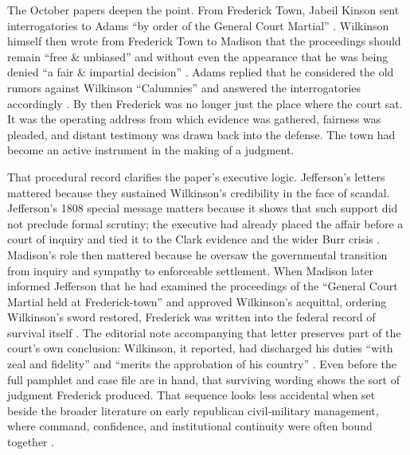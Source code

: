 The October papers deepen the point. From Frederick Town, Jabeil Kinson sent interrogatories to Adams ``by order of the General Court Martial'' \citep{kinson1811}. Wilkinson himself then wrote from Frederick Town to Madison that the proceedings should remain ``free \& unbiased'' and without even the appearance that he was being denied ``a fair \& impartial decision'' \citep{wilkinson1811madison}. Adams replied that he considered the old rumors against Wilkinson ``Calumnies'' and answered the interrogatories accordingly \citep{adams1811wilkinson}. By then Frederick was no longer just the place where the court sat. It was the operating address from which evidence was gathered, fairness was pleaded, and distant testimony was drawn back into the defense. The town had become an active instrument in the making of a judgment.

That procedural record clarifies the paper's executive logic. Jefferson's letters mattered because they sustained Wilkinson's credibility in the face of scandal. Jefferson's 1808 special message matters because it shows that such support did not preclude formal scrutiny; the executive had already placed the affair before a court of inquiry and tied it to the Clark evidence and the wider Burr crisis \citep{jefferson1808message}. Madison's role then mattered because he oversaw the governmental transition from inquiry and sympathy to enforceable settlement. When Madison later informed Jefferson that he had examined the proceedings of the ``General Court Martial held at Frederick-town'' and approved Wilkinson's acquittal, ordering Wilkinson's sword restored, Frederick was written into the federal record of survival itself \citep{madison1812}. The editorial note accompanying that letter preserves part of the court's own conclusion: Wilkinson, it reported, had discharged his duties ``with zeal and fidelity'' and ``merits the approbation of his country'' \citep{madison1812}. Even before the full pamphlet and case file are in hand, that surviving wording shows the sort of judgment Frederick produced. That sequence looks less accidental when set beside the broader literature on early republican civil-military management, where command, confidence, and institutional continuity were often bound together \citep{kohn1975,stagg1983,watson2012}.

